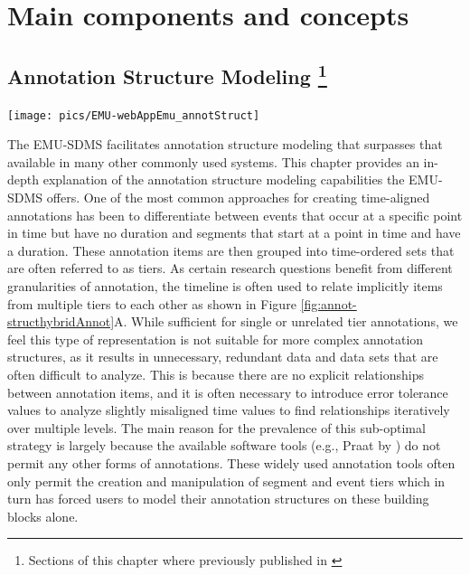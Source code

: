 \documentclass[]{book}
\let\rmarkdownfootnote\footnote%
\def\footnote{\protect\rmarkdownfootnote}
\begin{document}
\hypertarget{part-main-components-and-concepts}{%
\part{Main components and concepts}\label{part-main-components-and-concepts}}

\hypertarget{chap:annot-struct-mod}{%
\chapter[Annotation Structure Modeling ]{\texorpdfstring{Annotation Structure Modeling \footnote{Sections of this chapter where previously published in \citet{winkelmann:2017aa}}}{Annotation Structure Modeling }}\label{chap:annot-struct-mod}}

\begin{center}\texttt{[image: pics/EMU-webAppEmu\_annotStruct]} \end{center}

The EMU-SDMS facilitates annotation structure modeling that surpasses that available in many other commonly used systems. This chapter provides an in-depth explanation of the annotation structure modeling capabilities the EMU-SDMS offers. One of the most common approaches for creating time-aligned annotations has been to differentiate between events that occur at a specific point in time but have no duration and segments that start at a point in time and have a duration. These annotation items are then grouped into time-ordered sets that are often referred to as tiers. As certain research questions benefit from different granularities of annotation, the timeline is often used to relate implicitly items from multiple tiers to each other as shown in Figure \ref{fig:annot-structhybridAnnot}A. While sufficient for single or unrelated tier annotations, we feel this type of representation is not suitable for more complex annotation structures, as it results in unnecessary, redundant data and data sets that are often difficult to analyze. This is because there are no explicit relationships between annotation items, and it is often necessary to introduce error tolerance values to analyze slightly misaligned time values to find relationships iteratively over multiple levels. The main reason for the prevalence of this sub-optimal strategy is largely because the available software tools (e.g., Praat by \citet{boersma:2011a}) do not permit any other forms of annotations. These widely used annotation tools often only permit the creation and manipulation of segment and event tiers which in turn has forced users to model their annotation structures on these building blocks alone.
\end{document}
